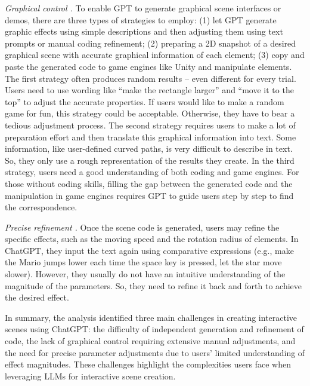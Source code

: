 \emph{Graphical control .}
To enable GPT to generate graphical scene interfaces or demos, there are {three} types of strategies to employ: (1) let GPT generate {graphic effects} using simple descriptions 
and then adjusting {them} %
using text prompts or manual coding refinement; (2) preparing a 2D snapshot of a %
desired graphical scene {with} %
accurate graphical information of each element; {(3) copy and paste the generated code to game engines like Unity and manipulate elements}. The first strategy {often} produces random results -- even different for every trial. Users need to use wording like ``make the rectangle larger'' and ``move it to the top'' to adjust the accurate properties. If users would like to make a random game for fun, {this strategy could} %
be acceptable. {Otherwise, they have to bear a tedious adjustment process}. %
The second strategy requires users to make a lot of preparation effort and then translate this graphical information into text. Some information, like user-defined curved paths, is very difficult to describe in text. So, they only use a rough representation of the results they create. {In the third strategy, users need a good understanding of both coding and game engines. For those without coding skills, filling the gap between the generated code and the manipulation in game engines requires GPT to guide users step by step to find the correspondence.}

\emph{Precise refinement .} Once the scene code is generated, users may refine the specific effects, such as the moving speed and the rotation radius of elements. 
In ChatGPT, they input the text again using comparative expressions (e.g., make the Mario jumps lower each time the space key is pressed, let the star move slower). However, they usually do not have an intuitive understanding of the magnitude of the parameters. So, they need to refine it back and forth to achieve the desired effect.

{In summary,} the analysis identified three main challenges in creating interactive scenes using ChatGPT: the difficulty of independent generation and refinement of code, the lack of graphical control requiring extensive manual adjustments, and the need for precise parameter adjustments due to users' limited understanding of effect magnitudes. These challenges highlight the complexities users face when leveraging LLMs %
for interactive scene creation.



